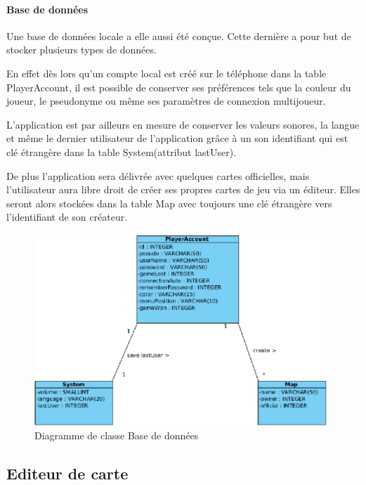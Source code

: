 	\paragraph{Base de données\\}
			
		Une base de données locale a elle aussi été conçue. Cette dernière a pour
		but de stocker plusieurs types de données.
				
		En effet dès lors qu'un compte local est créé sur le téléphone dans la
		table PlayerAccount, il est possible de conserver ses préférences tels 
		que la couleur du joueur, le pseudonyme ou même ses paramètres de connexion multijoueur.
				
		L'application est par ailleurs en mesure de conserver
		les valeurs sonores, la langue et même le dernier utilisateur de
		l'application grâce à un son identifiant qui est clé étrangère dans la table System(attribut lastUser).
				
		De plus l'application sera délivrée avec quelques cartes officielles, mais
		l'utilisateur aura libre droit de créer ses propres cartes de jeu via un
		éditeur. Elles seront alors stockées dans la table Map avec toujours une
		clé étrangère vers l'identifiant de son créateur. \\
		
		\newpage
				
		\begin{figure}
			\includegraphics[width=11cm]{./Analyse/Img/menu_bdd.eps}
			\caption{Diagramme de classe Base de données}
		\end{figure}	
	
\subsection{Editeur de carte}	

